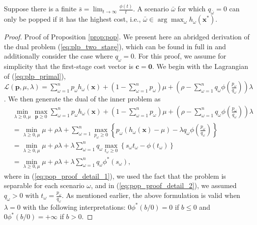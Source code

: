\documentclass[opre,nonblindrev]{informs3} %
\newcommand{\x}{\mathbf{x}}
\renewcommand{\c}{\mathbf{c}}
\newcommand{\p}{\mathbf{p}}
\begin{document}
\begin{proposition} \label{prop:pop}
	Suppose there is a finite $\bar{s} = \lim_{t \rightarrow \infty} \frac{\phi(t)}{t}$.
	A scenario $\bar{\omega}$ for which $q_{\bar{\omega}} = 0$ can only be popped if 
it has the highest cost, i.e.,  $\bar{\omega} \in \arg\max_{\omega} h_\omega(\x^*)$. 
\end{proposition}

\begin{proof}{\sc Proof of Proposition \ref{prop:pop}.}
	We present here an abridged derivation of the dual problem (\ref{eq:plp_two_stage}), which can be found in full in \cite{bental2011robust} and additionally consider the case where $q_\omega = 0$.
	For this proof, we assume for simplicity that the first-stage cost vector is $\c = \mathbf{0}$.	
	We begin with the Lagrangian of (\ref{eq:plp_primal}), $\mathcal{L}(\p,\mu,\lambda) = \sum_{\omega=1}^n p_\omega h_\omega(\x) + \left( 1-\sum_{\omega=1}^n p_\omega \right)\mu + \left( \rho - \sum_{\omega=1}^n q_\omega \phi\left(\frac{p_\omega}{q_\omega}\right) \right)\lambda$. 
We then generate the dual of the inner problem as
	\begin{align}
		 & \min_{\lambda \geq 0, \mu} \max_{\p \geq 0} \sum_{\omega=1}^n p_\omega h_\omega(\x) + \left( 1-\sum_{\omega=1}^n p_\omega \right)\mu + \left( \rho - \sum_{\omega=1}^n q_\omega \phi\left(\frac{p_\omega}{q_\omega}\right) \right)\lambda \nonumber \\
		& = \min_{\lambda \geq 0, \mu} \mu + \rho\lambda + \sum_{\omega=1}^n \max_{p_\omega \geq 0} \left\{ p_\omega (h_\omega(\x) - \mu) - \lambda q_\omega \phi\left(\frac{p_\omega}{q_\omega}\right) \right\} \label{eq:pop_proof_detail_1} \\
		& =  \min_{\lambda \geq 0, \mu} \mu + \rho\lambda + \lambda \sum_{\omega=1}^n q_\omega \max_{t_\omega \geq 0} \left\{ s_\omega t_\omega - \phi(t_\omega) \right\} \label{eq:pop_proof_detail_2} \\
		& = \min_{\lambda \geq 0, \mu} \mu + \rho\lambda + \lambda \sum_{\omega=1}^n q_\omega \phi^*\left(s_\omega\right), \nonumber
	\end{align}
	where in (\ref{eq:pop_proof_detail_1}), we used the fact that the problem is separable for each scenario $\omega$, and in (\ref{eq:pop_proof_detail_2}), we assumed $q_\omega > 0$ with $t_\omega = \frac{p_\omega}{q_\omega}$.
	As mentioned earlier, the above formulation is valid when $\lambda =0$ with the following interpretations: $0\phi^*(b/0)=0$ if $b\leq 0$ and  $0\phi^*(b/0)=+\infty$ if $b > 0$.
	

\end{proof}
\end{document}
